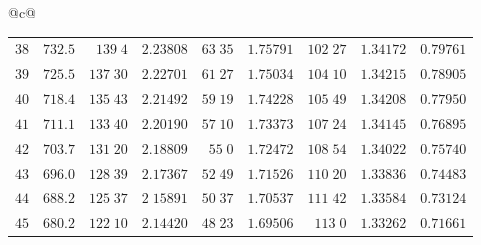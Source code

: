 \begin{center}
{\begin{tabular}{@{}c@{}}
\begin{tabular}{r|r|r|r|r|r|r|r|r}
$38$&$732.5$&$139\;4$&$2.23808$&$63\;35$&$1.75791$&$102\;27$&$1.34172$&$0.79761$\\
$39$&$725.5$&$137\;30$&$2.22701$&$61\;27$&$1.75034$&$104\;10$&$1.34215$&$0.78905$\\[2pt]
$40$&$718.4$&$135\;43$&$2.21492$&$59\;19$&$1.74228$&$105\;49$&$1.34208$&$0.77950$\\
$41$&$711.1$&$133\;40$&$2.20190$&$57\;10$&$1.73373$&$107\;24$&$1.34145$&$0.76895$\\
$42$&$703.7$&$131\;20$&$2.18809$&$55\;0$&$1.72472$&$108\;54$&$1.34022$&$0.75740$\\
$43$&$696.0$&$128\;39$&$2.17367$&$52\;49$&$1.71526$&$110\;20$&$1.33836$&$0.74483$\\
$44$&$688.2$&$125\;37$&$2\;15891$&$50\;37$&$1.70537$&$111\;42$&$1.33584$&$0.73124$\\[2pt]
$45$&$680.2$&$122\;10$&$2.14420$&$48\;23$&$1.69506$&$113\;0$&$1.33262$&$0.71661$\\
\end{tabular}
\end{tabular}%
}
\end{center}
\endgroup
\clearpage
{}
\begingroup
\fontsize{9}{10.2}\selectfont
\setlength{\tabcolsep}{1.5pt}
\renewcommand{\arraystretch}{1.02}

